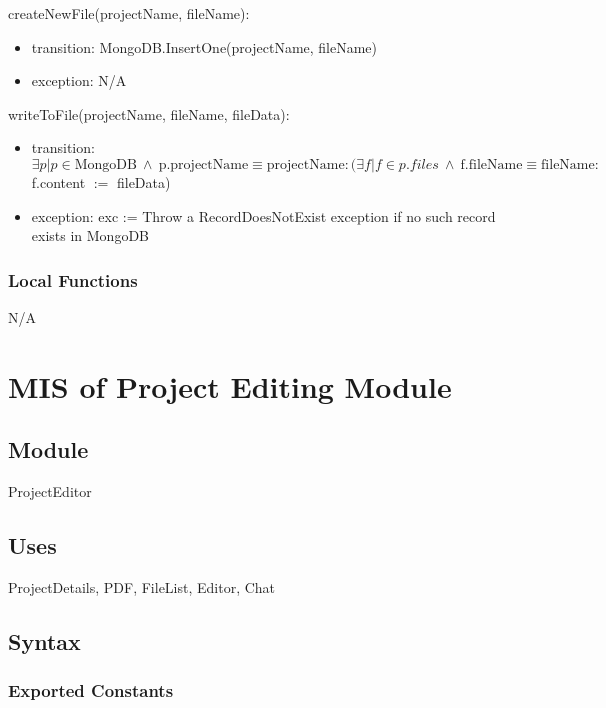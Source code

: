 \documentclass[12pt, titlepage]{article}
\begin{document}
	\noindent createNewFile(projectName, fileName):
	\begin{itemize}
		
		\item transition: MongoDB.InsertOne(projectName, fileName)
		
		\item exception: N/A
		
	\end{itemize}
	
	\noindent writeToFile(projectName, fileName, fileData):
	\begin{itemize}
		
		\item transition: $\exists p| p \in \text{MongoDB} ~\land~ \text{p.projectName} \equiv \text{projectName}: (\exists f| f \in p.files ~\land ~ \text{f.fileName} \equiv \text{fileName}:  $ f.content $:=$ fileData)
		
		\item exception: exc := Throw a RecordDoesNotExist exception if no such record exists in MongoDB
		
	\end{itemize}
	
	\subsubsection{Local Functions}
	
	N/A
	
	\newpage
	
	\section{MIS of Project Editing Module} \label{Module} 
	
	\subsection{Module}
	
	ProjectEditor
	
	\subsection{Uses}
	ProjectDetails, PDF, FileList, Editor, Chat
	
	\subsection{Syntax}
	
	\subsubsection{Exported Constants}
	
\end{document}
